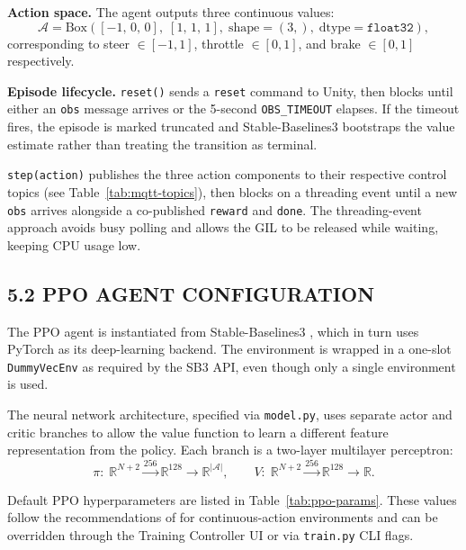 \documentclass[12pt,a4paper]{article}
\begin{document}
\textbf{Action space.} The agent outputs three continuous values:
\begin{equation*}
  \mathcal{A} = \text{Box}\!\left([-1,\,0,\,0],\; [1,\,1,\,1],\; \text{shape}=(3,),\; \text{dtype}=\texttt{float32}\right),
\end{equation*}
corresponding to steer $\in [-1, 1]$, throttle $\in [0, 1]$, and
brake $\in [0, 1]$ respectively.

\textbf{Episode lifecycle.} \texttt{reset()} sends a \texttt{reset} command to
Unity, then blocks until either an \texttt{obs} message arrives or the 5-second
\texttt{OBS\_TIMEOUT} elapses. If the timeout fires, the episode is marked
truncated and Stable-Baselines3 bootstraps the value estimate rather than
treating the transition as terminal.

\texttt{step(action)} publishes the three action components to their respective
control topics (see Table~\ref{tab:mqtt-topics}), then blocks on a threading
event until a new \texttt{obs} arrives alongside a co-published
\texttt{reward} and \texttt{done}. The threading-event approach avoids busy
polling and allows the GIL to be released while waiting, keeping CPU usage low.

\subsection*{5.2 \quad PPO AGENT CONFIGURATION}

\indent The PPO agent is instantiated from Stable-Baselines3 \cite{Raffin2021},
which in turn uses PyTorch \cite{Paszke2019} as its deep-learning backend.
The environment is wrapped in a one-slot \texttt{DummyVecEnv} as required by
the SB3 API, even though only a single environment is used.

The neural network architecture, specified via \texttt{model.py}, uses separate
actor and critic branches to allow the value function to learn a different
feature representation from the policy. Each branch is a two-layer multilayer
perceptron:
\begin{equation*}
  \pi:\; \mathbb{R}^{N+2} \xrightarrow{256} \mathbb{R}^{128} \to \mathbb{R}^{|\mathcal{A}|},
  \qquad
  V:\; \mathbb{R}^{N+2} \xrightarrow{256} \mathbb{R}^{128} \to \mathbb{R}.
\end{equation*}

Default PPO hyperparameters are listed in Table~\ref{tab:ppo-params}. These
values follow the recommendations of \cite{Raffin2021} for continuous-action
environments and can be overridden through the Training Controller UI or via
\texttt{train.py} CLI flags.
\end{document}
